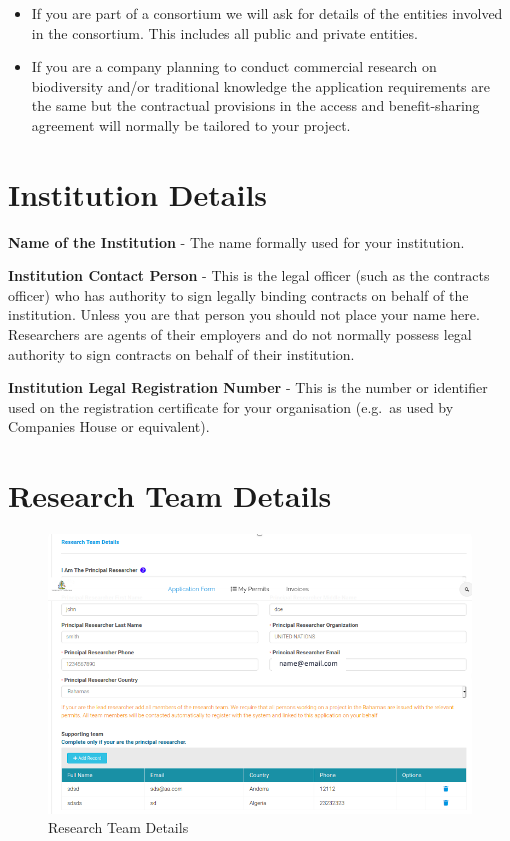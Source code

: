 \documentclass[
]{book}
\providecommand{\tightlist}{%
  \setlength{\itemsep}{0pt}\setlength{\parskip}{0pt}}
\begin{document}
\begin{itemize}
\tightlist
\item
  If you are part of a consortium we will ask for details of the entities involved in the consortium. This includes all public and private entities.
\item
  If you are a company planning to conduct commercial research on biodiversity and/or traditional knowledge the application requirements are the same but the contractual provisions in the access and benefit-sharing agreement will normally be tailored to your project.
\end{itemize}

\hypertarget{institution-details}{%
\section{Institution Details}\label{institution-details}}

\textbf{Name of the Institution} - The name formally used for your institution.

\textbf{Institution Contact Person} - This is the legal officer (such as the contracts officer) who has authority to sign legally binding contracts on behalf of the institution. Unless you are that person you should not place your name here. Researchers are agents of their employers and do not normally possess legal authority to sign contracts on behalf of their institution.

\textbf{Institution Legal Registration Number} - This is the number or identifier used on the registration certificate for your organisation (e.g.~as used by Companies House or equivalent).

\hypertarget{research-team-details}{%
\section{Research Team Details}\label{research-team-details}}

\begin{figure}
\centering
\includegraphics{images/research_team_details.png}
\caption{Research Team Details}
\end{figure}
\end{document}
